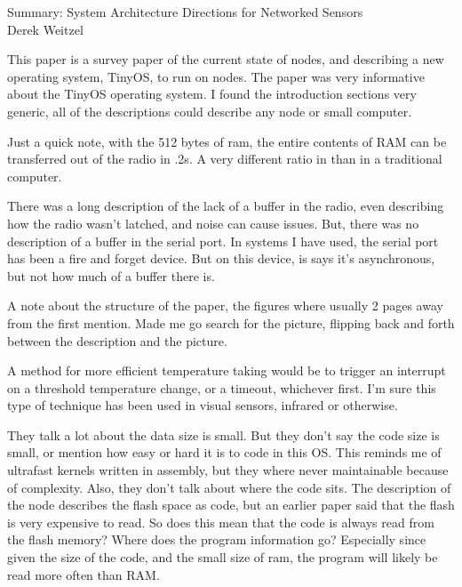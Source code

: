 \documentclass[12pt]{article}
\begin{document}
\begin{center}
{\huge Summary: System Architecture Directions for Networked Sensors } \\
Derek Weitzel
\end{center}

This paper is a survey paper of the current state of nodes, and describing a new operating system, TinyOS, to run on nodes.  The paper was very informative about the TinyOS operating system.  I found the introduction sections very generic, all of the descriptions could describe any node or small computer.

Just a quick note, with the 512 bytes of ram, the entire contents of RAM can be transferred out of the radio in .2s.  A very different ratio in than in a traditional computer.

There was a long description of the lack of a buffer in the radio, even describing how the radio wasn't latched, and noise can cause issues.  But, there was no description of a buffer in the serial port.  In systems I have used, the serial port has been a fire and forget device.  But on this device, is says it's asynchronous, but not how much of a buffer there is.

A note about the structure of the paper, the figures where usually 2 pages away from the first mention.  Made me go search for the picture, flipping back and forth between the description and the picture.

A method for more efficient temperature taking would be to trigger an interrupt on a threshold temperature change, or a timeout, whichever first.  I'm sure this type of technique has been used in visual sensors, infrared or otherwise.

They talk a lot about the data size is small.  But they don't say the code size is small, or mention how easy or hard it is to code in this OS.  This reminds me of ultrafast kernels written in assembly, but they where never maintainable because of complexity.  Also, they don't talk about where the code sits.  The description of the node describes the flash space as code, but an earlier paper said that the flash is very expensive to read.  So does this mean that the code is always read from the flash memory?  Where does the program information go?  Especially since given the size of the code, and the small size of ram, the program will likely be read more often than RAM.
\end{document}
